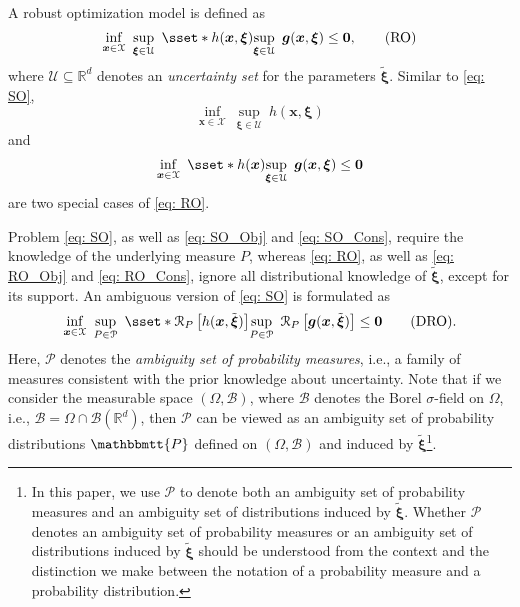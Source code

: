 \documentclass[final,onefignum,onetabnum]{class}
\newcommand{\rrisk}[2]{\Cs{R}_{#1} \left[ #2 \right]}
\newcommand{\bs}[1]{\boldsymbol{#1}} %
\newcommand{\Bs}[1]{\mathbb{#1}} %
\newcommand{\Ts}[1]{\mathbbmtt{#1}} %
\newcommand{\Cs}[1]{\mathcal{#1}} %
\newcommand{\txi}{\tilde{\bs{\xi}}}
\begin{document}
A robust optimization model is defined as 
\begin{equation}
\label{eq: RO}
\inf_{\bs{x} \in \Cs{X} } \ \sup_{\bs{\xi} \in \Cs{U}} \ \sset*{h(\bs{x}, \bs{\xi})}{\sup_{\bs{\xi} \in \Cs{U}} \ \bs{g}(\bs{x},\bs{\xi}) \le \bs{0} }, \tag{\text{RO}}
\end{equation}
where $\Cs{U} \subseteq \Bs{R}^{d}$ denotes  an {\it uncertainty set} for the  parameters $\txi$. Similar to \eqref{eq: SO}, 
\begin{equation}
    \label{eq: RO_Obj}
    \inf_{\bs{x} \in \Cs{X} } \ \sup_{\bs{\xi} \in \Cs{U}} \ h(\bs{x}, \bs{\xi})
\end{equation} 
and 
\begin{equation}
    \label{eq: RO_Cons}
    \inf_{\bs{x} \in \Cs{X} } \ \sset*{h(\bs{x})}{\sup_{\bs{\xi} \in \Cs{U}} \ \bs{g}(\bs{x},\bs{\xi}) \le \bs{0} }
\end{equation}
are two special cases of \eqref{eq: RO}. 

Problem \eqref{eq: SO}, as well as \eqref{eq: SO_Obj} and \eqref{eq: SO_Cons}, require the knowledge of the underlying measure $P$, whereas  \eqref{eq: RO}, as well as \eqref{eq: RO_Obj} and \eqref{eq: RO_Cons}, ignore all distributional knowledge of $\txi$, except for its support. 
An ambiguous version of \eqref{eq: SO} is formulated as 
\begin{equation}
\label{eq: DRO}
\inf_{\bs{x} \in \Cs{X} } \ \sup_{P \in \Cs{P}} \ 	\sset*{\rrisk{P}{h(\bs{x},\txi)}}{\sup_{P \in \Cs{P} } \ \rrisk{P }{\bs{g}(\bs{x},\txi)} \le \bs{0}} \tag{\text{DRO}}.
\end{equation}
Here, $\Cs{P}$ denotes the {\it ambiguity set of probability measures}, i.e., a family of measures consistent with the prior knowledge about uncertainty. %
Note that if we consider the measurable space $(\Omega, \Cs{B})$, where $\Cs{B}$ denotes the Borel $\sigma$-field on $\Omega$, i.e., $\Cs{B}=\Omega \cap \Cs{B}(\Bs{R}^{d})$, %
then $\Cs{P}$ can be viewed as an ambiguity set of probability distributions $\Ts{P}$ defined on $(\Omega, \Cs{B})$ and induced by $\txi$\footnote{In this paper, we use $\Cs{P}$ to denote both an ambiguity set of probability measures  and an ambiguity set of  distributions induced by $\txi$. Whether  $\Cs{P}$  denotes  an ambiguity set of probability measures  or an ambiguity set of distributions induced by $\txi$ should be understood from the context and the distinction we make between the notation of a probability measure and a probability distribution.}. 
\end{document}
